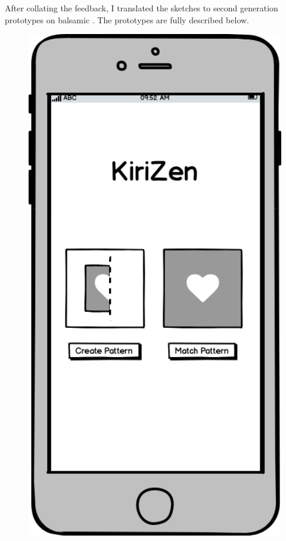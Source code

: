 \documentclass[11pt]{article}
\begin{document}
        After collating the feedback, I translated the sketches to second generation prototypes on balsamic \cite{Balsamiq}. The prototypes are fully described below. 
    
\clearpage
             \begin{figure}
                \begin{minipage}[c]{0.35\textwidth}
                \includegraphics[width=1\textwidth]{Images/Prototype/prototypeHomeScreen}

\end{minipage}
\end{figure}
\end{document}
